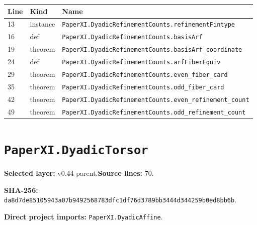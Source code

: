 \documentclass[10pt,oneside]{book}
\begin{document}
\begin{longtable}{@{}p{}p{}p{}@{}}\toprule Line&Kind&Name\\\midrule\endhead

13&instance&\nolinkurl{PaperXI.DyadicRefinementCounts.refinementFintype}\\

16&def&\nolinkurl{PaperXI.DyadicRefinementCounts.basisArf}\\

19&theorem&\nolinkurl{PaperXI.DyadicRefinementCounts.basisArf_coordinate}\\

24&def&\nolinkurl{PaperXI.DyadicRefinementCounts.arfFiberEquiv}\\

29&theorem&\nolinkurl{PaperXI.DyadicRefinementCounts.even_fiber_card}\\

35&theorem&\nolinkurl{PaperXI.DyadicRefinementCounts.odd_fiber_card}\\

42&theorem&\nolinkurl{PaperXI.DyadicRefinementCounts.even_refinement_count}\\

49&theorem&\nolinkurl{PaperXI.DyadicRefinementCounts.odd_refinement_count}\\

\bottomrule\end{longtable}

\section{\texorpdfstring{\nolinkurl{PaperXI.DyadicTorsor}}{PaperXI.DyadicTorsor}}\label{module:PaperXI.DyadicTorsor}

\textbf{Selected layer:} v0.44 parent.\quad\textbf{Source lines:} 70.\par\textbf{SHA-256:} {\scriptsize\nolinkurl{da8d7de85105943a07b9492568783dfc1df76d3789bb3444d344259b0ed8bb6b}}.


\textbf{Direct project imports:} \nolinkurl{PaperXI.DyadicAffine}.
\end{document}
